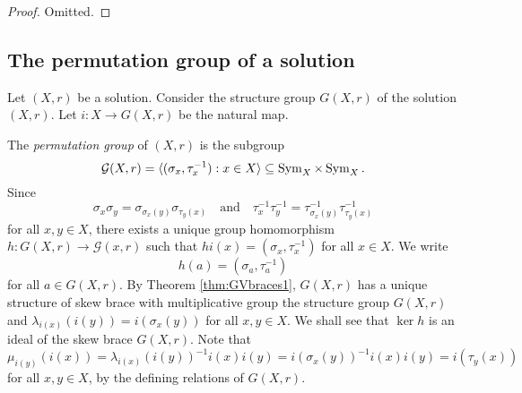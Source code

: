     \begin{proof}
        Omitted.
    \end{proof}

    \subsection{The permutation group of a solution}

    Let $(X,r)$ be a solution. Consider the structure group $G(X,r)$ of the solution $(X,r)$. Let $i\colon X\to G(X,r)$ be the natural map. 

    The \emph{permutation group} of $(X,r)$ is the subgroup
\[\mathcal{G}(X,r)=\langle (\sigma_x,\tau^{-1}_x) : x\in X\rangle\subseteq\operatorname{Sym}_X\times\operatorname{Sym}_X.\]
Since 
\[ \sigma_x\sigma_y=\sigma_{\sigma_x(y)}\sigma_{\tau_y(x)}\quad\text{and}\quad \tau^{-1}_x\tau^{-1}_y=\tau^{-1}_{\sigma_x(y)}\tau^{-1}_{\tau_y(x)} \]
for all $x,y\in X$, there exists a unique group homomorphism
$h\colon G(X,r)\to \mathcal{G}(x,r)$ such that $hi(x)=(\sigma_x,\tau^{-1}_x)$ for all $x\in X$. We write
\[ h(a)=(\sigma_a,\tau_a^{-1})\]
for all $a\in G(X,r)$.
By Theorem \ref{thm:GVbraces1}, $G(X,r)$ has a unique structure of skew brace with multiplicative group the structure group $G(X,r)$ and $\lambda_{i(x)}(i(y))=i(\sigma_x(y))$ for all $x,y\in X$. We shall see that $\ker h$ is an ideal of the skew brace $G(X,r)$. Note that
\[\mu_{i(y)}(i(x))=\lambda_{i(x)}(i(y))^{-1}i(x)i(y)=i(\sigma_x(y))^{-1}i(x)i(y)=i(\tau_y(x))\]
for all $x,y\in X$, by the defining relations of $G(X,r)$.



   



